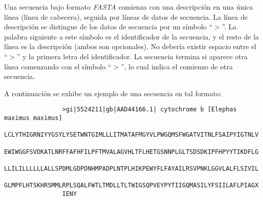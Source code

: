 \documentclass[12pt,a4paper,spanish]{article}
\begin{document}
		\par Una secuencia bajo formato \textit{FASTA} comienza con una descripción en una única línea (línea de 			cabecera), seguida por líneas de datos de secuencia. La línea de descripción se distingue de los datos de 			secuencia por un símbolo ``$>$''. La palabra siguiente a este símbolo es el identificador de la secuencia, y el 		resto de la línea es la descripción (ambos son opcionales). No debería existir espacio entre el ``$>$'' y la 			primera letra del identificador. La secuencia termina si aparece otra línea comenzando con el símbolo ``$>$'', lo 			cual indica el comienzo de otra secuencia. 
		\par A continuación se exhibe un ejemplo de una secuencia en tal formato:	
		\begin{verbatim}
				>gi|5524211|gb|AAD44166.1| cytochrome b [Elephas maximus maximus]
				LCLYTHIGRNIYYGSYLYSETWNTGIMLLLITMATAFMGYVLPWGQMSFWGATVITNLFSAIPYIGTNLV
				EWIWGGFSVDKATLNRFFAFHFILPFTMVALAGVHLTFLHETGSNNPLGLTSDSDKIPFHPYYTIKDFLG
				LLILILLLLLLALLSPDMLGDPDNHMPADPLNTPLHIKPEWYFLFAYAILRSVPNKLGGVLALFLSIVIL
				GLMPFLHTSKHRSMMLRPLSQALFWTLTMDLLTLTWIGSQPVEYPYTIIGQMASILYFSIILAFLPIAGX
				IENY
		\end{verbatim}
\end{document}
